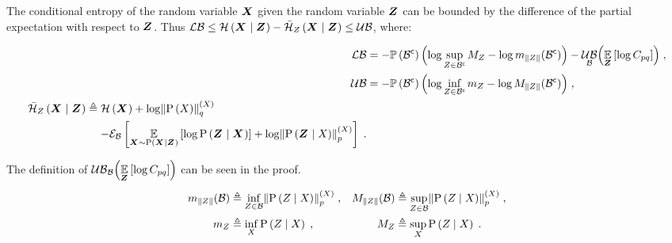 \begin{theoremE}
	\label{thm:entropy_bounds}
	The conditional entropy of the random variable $\boldsymbol X_{}$ given the random variable $\boldsymbol Z_{}$ can be bounded by the difference of the partial expectation with respect to $\boldsymbol Z_{}$. Thus $\operatorname*{\mathcal{LB}}\leq\mathcal{H}\left({\boldsymbol X_{}}\mid{\ensuremath{\boldsymbol Z_{}}}\right)-\bar{\mathcal{H}}_{Z_{}}\left({\boldsymbol X_{}}\mid{\ensuremath{\boldsymbol Z_{}}}\right)\leq\operatorname*{\mathcal{UB}}$, where:
	\begin{small}
		\begin{subequations}
			\begin{align}
				\lowerbound&=-\measure{\stcomp{\subSpace}}\Bigl(\log\sup_{\observations{}\in\stcomp{\subSpace}}M_{\observations{}}-\log m_{\norm{\observations{}}}(\stcomp{\subSpace})\Bigr)-\upperbound_\subSpace\Bigl(\expectation{\log C_{pq}}{\observationsRV{}}\Bigr)\;,
				\\
				\upperbound& =-\measure{\stcomp{\subSpace}}\Bigl(\log\inf_{\observations{}\in\stcomp{\subSpace}}m_{\observations{}}-\log M_{\norm{\observations{}}}(\stcomp{\subSpace})\Bigr)\;,\\
				\begin{split}
					\simplecondEntropy{\statesRV{}}{\observationsRV{}}{\observations{}}&\triangleq\entropy{\statesRV{}}+\log\pnorm{\prob{\states{}}}{q}{\states{}}\\
					&\phantomeq-\partialexpectation{\expectation{\log\probcond{\observationsRV{}}{\statesRV{}}}{\statesRV{}\sim\probcond{\statesRV{}}{\observationsRV{}}}+\log\pnorm{\probcond{\observationsRV{}}{\states{}}}{p}{\states{}}}{\subSpace}\;.
				\end{split}
			\end{align}
		\end{subequations}
	\end{small}
	The definition of $\operatorname*{\mathcal{UB}}_\mathcal B\Bigl(\operatorname*{\mathbb{E}}\limits_{\boldsymbol Z_{}}\left[{\log C_{pq}}\right]\Bigr)$ can be seen in the proof.
	\begin{align*}
		m_{\norm{\observations{}}}(\subSpace) &\triangleq\inf_{\observations{}\in\subSpace}\pnorm{\probcond{\observations{}}{\states{}}}{p}{\states{}}\;,&M_{\norm{\observations{}}}(\subSpace) &\triangleq\sup_{\observations{}\in\subSpace}\pnorm{\probcond{\observations{}}{\states{}}}{p}{\states{}}\;,\\
		m_{\observations{}}&\triangleq\inf_{\states{}}\probcond{\observations{}}{\states{}}\;,&M_{\observations{}}&\triangleq\sup_{\states{}}\probcond{\observations{}}{\states{}}\;.
	\end{align*}
\end{theoremE}
